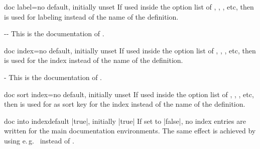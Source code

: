 \begin{docTcbKey}[][doc new={2019-09-18}]{doc label}{=}{no default, initially unset}
  If used inside the option list of , ,
  , etc, then  is used
  for labeling instead of the name of the definition.
\begin{dispExample}
\begin{docPathOperation*}[doc label=pathline]{-{}-}{}
  This is the documentation of .
\end{docPathOperation*}
\end{dispExample}
\end{docTcbKey}

\begin{docTcbKey}[][doc new={2020-01-07}]{doc index}{=}{no default, initially unset}
  If used inside the option list of , ,
  , etc, then  is used
  for the index instead of the name of the definition.
\begin{dispExample}
\begin{docPathOperation}[doc index=foo path (horizontal then vertical),
    doc label=pathline2]{-\textbar}{}
  This is the documentation of .
\end{docPathOperation}
\end{dispExample}
\end{docTcbKey}


\begin{docTcbKey}[][doc new={2020-04-23}]{doc sort index}{=}{no default, initially unset}
  If used inside the option list of , ,
  , etc, then  is used
  for as sort key for the index instead of the name of the definition.
\begin{dispListing}
\begin{docCommands}[
    doc name        = l_tcobox_example_tl,
    doc sort index  = example_tl,  %
  ]{}
\end{docCommands}
\end{dispListing}
\end{docTcbKey}

\clearpage

\begin{docTcbKey}{doc into index}{}{default |true|, initially |true|}
  If set to |false|, no index entries are written for the main documentation
  environments. The same effect is achieved by using e.\,g.\ 
  instead of .
\end{docTcbKey}


